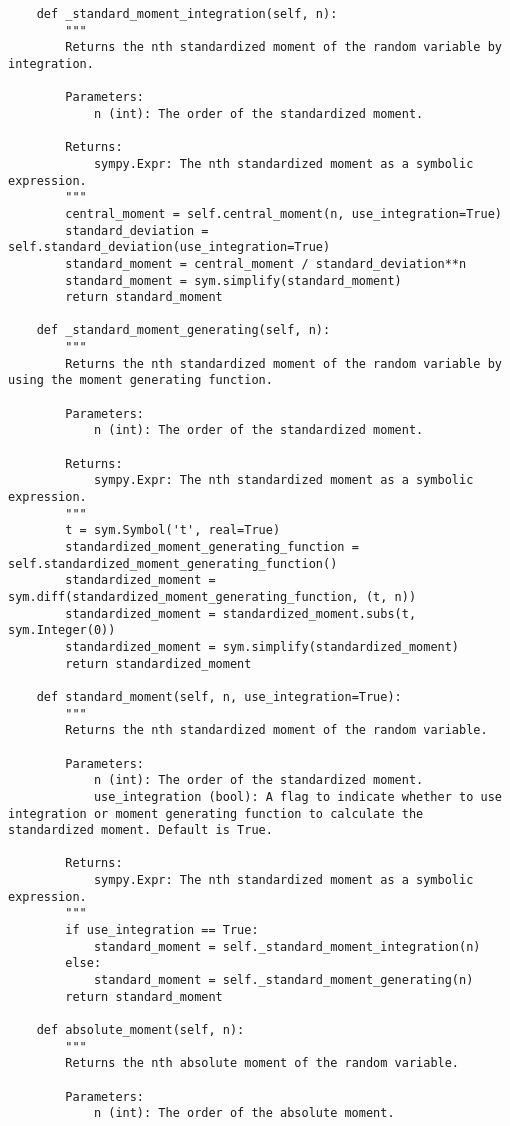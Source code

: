 \begin{small}
\begin{lstlisting}
    def _standard_moment_integration(self, n):
        """
        Returns the nth standardized moment of the random variable by integration.

        Parameters:
            n (int): The order of the standardized moment.

        Returns:
            sympy.Expr: The nth standardized moment as a symbolic expression.
        """
        central_moment = self.central_moment(n, use_integration=True)
        standard_deviation = self.standard_deviation(use_integration=True)
        standard_moment = central_moment / standard_deviation**n
        standard_moment = sym.simplify(standard_moment)
        return standard_moment

    def _standard_moment_generating(self, n):
        """
        Returns the nth standardized moment of the random variable by using the moment generating function.

        Parameters:
            n (int): The order of the standardized moment.

        Returns:
            sympy.Expr: The nth standardized moment as a symbolic expression.
        """
        t = sym.Symbol('t', real=True)
        standardized_moment_generating_function = self.standardized_moment_generating_function()
        standardized_moment = sym.diff(standardized_moment_generating_function, (t, n))
        standardized_moment = standardized_moment.subs(t, sym.Integer(0))
        standardized_moment = sym.simplify(standardized_moment)
        return standardized_moment

    def standard_moment(self, n, use_integration=True):
        """
        Returns the nth standardized moment of the random variable.

        Parameters:
            n (int): The order of the standardized moment.
            use_integration (bool): A flag to indicate whether to use integration or moment generating function to calculate the standardized moment. Default is True.

        Returns:
            sympy.Expr: The nth standardized moment as a symbolic expression.
        """
        if use_integration == True:
            standard_moment = self._standard_moment_integration(n)
        else:
            standard_moment = self._standard_moment_generating(n)
        return standard_moment

    def absolute_moment(self, n):
        """
        Returns the nth absolute moment of the random variable.

        Parameters:
            n (int): The order of the absolute moment.


\end{lstlisting}
\end{small}
